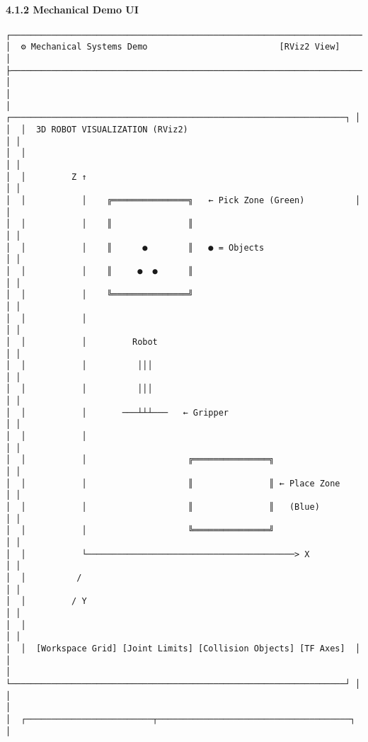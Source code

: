 \documentclass[
]{article}
\begin{document}
\hypertarget{mechanical-demo-ui}{%
\paragraph{4.1.2 Mechanical Demo UI}\label{mechanical-demo-ui}}

\begin{verbatim}
┌────────────────────────────────────────────────────────────────────────┐
│  ⚙️ Mechanical Systems Demo                          [RViz2 View]      │
├────────────────────────────────────────────────────────────────────────┤
│                                                                        │
│  ┌──────────────────────────────────────────────────────────────────┐ │
│  │  3D ROBOT VISUALIZATION (RViz2)                                  │ │
│  │                                                                   │ │
│  │         Z ↑                                                       │ │
│  │           │    ╔═══════════════╗   ← Pick Zone (Green)          │ │
│  │           │    ║               ║                                 │ │
│  │           │    ║      ●        ║   ● = Objects                   │ │
│  │           │    ║     ●  ●      ║                                 │ │
│  │           │    ╚═══════════════╝                                 │ │
│  │           │                                                       │ │
│  │           │         Robot                                        │ │
│  │           │          │││                                         │ │
│  │           │          │││                                         │ │
│  │           │       ───┴┴┴───   ← Gripper                          │ │
│  │           │                                                       │ │
│  │           │                    ╔═══════════════╗                 │ │
│  │           │                    ║               ║ ← Place Zone    │ │
│  │           │                    ║               ║   (Blue)         │ │
│  │           │                    ╚═══════════════╝                 │ │
│  │           └─────────────────────────────────────────> X          │ │
│  │          /                                                        │ │
│  │         / Y                                                       │ │
│  │                                                                   │ │
│  │  [Workspace Grid] [Joint Limits] [Collision Objects] [TF Axes]  │ │
│  └──────────────────────────────────────────────────────────────────┘ │
│                                                                        │
│  ┌─────────────────────────┬──────────────────────────────────────┐   │

\end{verbatim}
\end{document}
